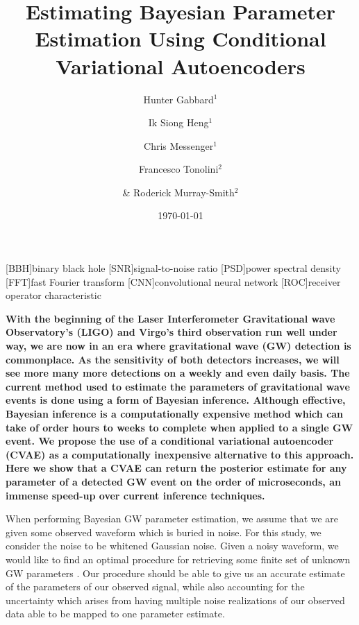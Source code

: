 \documentclass[%
showpacs,
 amsmath,amssymb,
 aps,
 twocolumn,
 prl,
 reprint,
floatfix,
]{revtex4-1}
\begin{document}

\title{Estimating Bayesian Parameter Estimation Using Conditional Variational Autoencoders}

\author{Hunter Gabbard$^1$}
\author{Ik Siong Heng$^1$}
\author{Chris Messenger$^1$}
\author{Francesco Tonolini$^2$}
\author{\& Roderick Murray-Smith$^2$}


\date{\today}

\maketitle

[BBH]{binary black hole}
[SNR]{signal-to-noise ratio}
[PSD]{power spectral density}
[FFT]{fast Fourier transform}
[CNN]{convolutional neural network}
[ROC]{receiver operator characteristic}

%
%
\textbf{
With the beginning of the Laser Interferometer Gravitational wave Observatory's 
(LIGO) and Virgo's third observation run well under way, we are now in an era 
where gravitational wave (GW) detection is commonplace. As the sensitivity of 
both detectors increases, we will see more many more detections on a weekly 
and even daily basis.  The current method used to estimate the parameters of 
gravitational wave events is done using a form of Bayesian inference. Although 
effective, Bayesian inference is a computationally expensive method which can 
take of order hours to weeks to complete when applied to a single GW event. We 
propose the use of a conditional variational autoencoder (CVAE) as a 
computationally inexpensive alternative to this approach. Here we show that 
a CVAE can return the posterior estimate for any parameter of a detected GW 
event on the order of microseconds, an immense speed-up over current 
inference techniques.}

%
%
When performing Bayesian GW parameter estimation, we assume that we are given 
some observed waveform which is buried in noise. For this study, we consider 
the noise to be whitened Gaussian noise. Given a noisy waveform, we would like 
to find an optimal procedure for retrieving some finite set of unknown GW parameters \cite{Jaranowski2012}
. Our procedure should be able to give us an accurate estimate 
of the parameters of our observed signal, while also accounting for the uncertainty 
which arises from having multiple noise realizations of our observed data able to 
be mapped to one parameter estimate.
\end{document}
